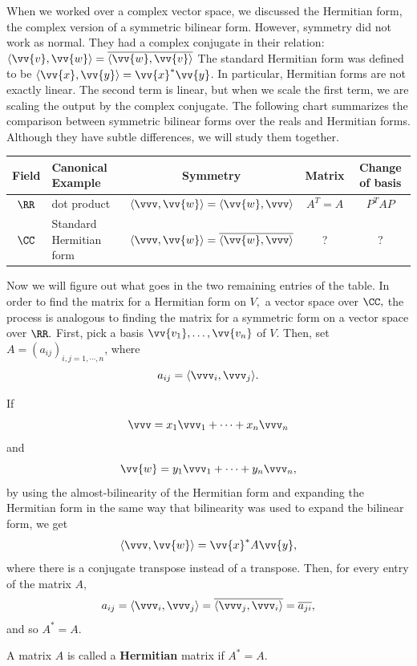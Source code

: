When we worked over a complex vector space, we discussed the Hermitian form, the complex version of a symmetric bilinear form. However, symmetry did not work as normal. 
They had a complex conjugate in their relation: $\langle \vv{v}, \vv{w} \rangle = \overline{\langle \vv{w}, \vv{v}\rangle}$
The standard Hermitian form was defined to be $\langle \vv{x}, \vv{y} \rangle = \vv{x}^* \vv{y}$.
In particular, Hermitian forms are not exactly linear.
The second term is linear, but when we scale the first term, we are scaling the output by the complex conjugate.
The following chart summarizes the comparison between symmetric bilinear forms over the reals and Hermitian forms.
Although they have subtle differences, we will study them together. 
\begin{center}
\begin{tabular}{|c|p{3.27cm}|c|c|c|}
    \hline
    Field & Canonical Example& Symmetry & Matrix & Change of basis \\
    \hline
    $\RR$ & dot product & $\langle \vvv, \vv{w} \rangle = \langle \vv{w}, \vvv\rangle $ & $A^T = A$ & $P^T A P $\\
    \hline
    \rule{0pt}{4ex} $\CC$ & Standard Hermitian form & $\langle \vvv, \vv{w} \rangle = \overline{\langle \vv{w}, \vvv \rangle }$ &? & ?\\

    \hline
\end{tabular}
\end{center}
Now we will figure out what goes in the two remaining entries of the table. 
In order to find the matrix for a Hermitian form on $V,$ a vector space over $\CC,$ the process is analogous to finding the matrix for a symmetric form on a vector space over $\RR.$ First, pick a basis $\vv{v_1}, \ldots, \vv{v_n}$ of $V.$ Then, set $A = (a_{ij})_{i, j = 1, \cdots, n}$, where 
\[
a_{ij} = \langle \vvv_i, \vvv_j \rangle.
\]

If 
\[
\vvv = x_1\vvv_1 + \cdots + x_n\vvv_n
\]
and 
\[
\vv{w} = y_1\vvv_1 + \cdots + y_n\vvv_n,
\]
by using the almost-bilinearity of the Hermitian form and expanding the Hermitian form in the same way that bilinearity was used to expand the bilinear form, we get
\[
\langle \vvv, \vv{w} \rangle = \vv{x}^{*} A \vv{y},
\]
where there is a conjugate transpose instead of a transpose. Then, for every entry of the matrix $A,$
\[
a_{ij} = \langle \vvv_i, \vvv_j \rangle = \overline{\langle \vvv_j, \vvv_i \rangle} = \overline{a_{ji}},
\]
and so $A^* = A.$
\begin{definition}
    A matrix $A$ is called a \textbf{Hermitian} matrix if $A^* = A$. 
\end{definition}

